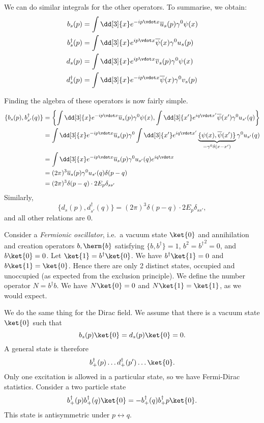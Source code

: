 \documentclass{jknotes} %
\begin{document}
We can do similar integrals for the other operators. To summarise, we obtain:
\begin{align}
    b_s(p) &= \int\dd[3]{x}e^{-ip\vdot x}\overline{u}_s(p)\gamma^0\psi(x) \\
    b^\dagger_s(p) &= \int\dd[3]{x}e^{ip\vdot x}\overline{\psi}(x)\gamma^0 u_s(p) \\
    d_s(p) &= \int\dd[3]{x}e^{ip\vdot x}\overline{v}_s(p)\gamma^0\psi(x) \\
    d^\dagger_s(p) &= \int\dd[3]{x}e^{-ip\vdot x}\overline{\psi}(x)\gamma^0 v_s(p)
\end{align}

Finding the algebra of these operators is now fairly simple.
\begin{align}
    \{b_s(p),b_{s'}^\dagger(q)\} &= \left\{\int\dd[3]{x}e^{-ip\vdot x}\overline{u}_s(p)\gamma^0\psi(x), \int\dd[3]{x'} e^{iq\vdot x'}\overline{\psi}(x')\gamma^0u_{s'}(q)\right\} \\
                                 &= \int\dd[3]{x}e^{-ip\vdot x}\overline{u}_s(p)\gamma^0\int\dd[3]{x'}e^{iq\vdot x'}\underbrace{\{\psi(x),\overline{\psi}(x')\}}_{=\gamma^0\delta(x-x')} \gamma^0 u_{s'}(q) \\
                                 &= \int\dd[3]{x}e^{-ip\vdot x}\overline{u}_s(p)\gamma^0u_{s'}(q)e^{iq\vdot x} \\
                                 &= (2\pi)^3\overline{u}_s(p)\gamma^0u_{s'}(q)\delta(p-q) \\
                                 &= (2\pi)^3\delta(p-q)\cdot2E_p\delta_{ss'}
\end{align}
Similarly,
\begin{equation}
    \{d_s(p),d_{s'}^\dagger(q)\} = (2\pi)^3\delta(p-q)\cdot2E_p\delta_{ss'},
\end{equation}
and all other relations are 0.

Consider a \emph{Fermionic oscillator}, i.e.\ a vacuum state \(\ket{0}\) and annihilation and creation operators \(b,\herm{b}\) satisfying \(\{b,b^\dagger\}=1\), \(b^2={b^\dagger}^2=0\), and \(b\ket{0}=0\). Let \(\ket{1}=b^\dagger\ket{0}\). We have \(b^\dagger\ket{1}=0\) and \(b\ket{1}=\ket{0}\). Hence there are only 2 distinct states, occupied and unoccupied (as expected from the exclusion principle). We define the number operator \(N=b^\dagger b\). We have \(N\ket{0}=0\) and \(N\ket{1}=\ket{1}\), as we would expect.

We do the same thing for the Dirac field. We assume that there is a vacuum state \(\ket{0}\) such that
\begin{equation}
    b_s(p)\ket{0} = d_s(p)\ket{0} = 0.
\end{equation}
A general state is therefore
\begin{equation}
    b_+^\dagger(p)\dots d_+^\dagger(p')\dots \ket{0}.
\end{equation}
Only one excitation is allowed in a particular state, so we have Fermi-Dirac statistics. Consider a two particle state
\begin{equation}
    b_+^\dagger(p) b_+^\dagger(q)\ket{0} = -b_+^\dagger(q) b_+^\dagger{p}\ket{0}.
\end{equation}
This state is antisymmetric under \(p\leftrightarrow q\).
\end{document}
